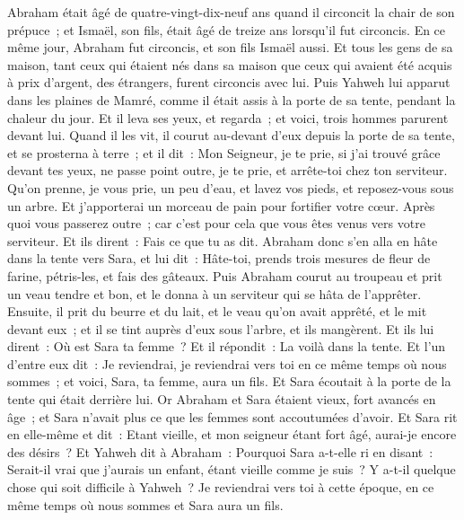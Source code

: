 \begin{multicols}{2}
Abraham était âgé de quatre-vingt-dix-neuf ans quand il circoncit la chair de son prépuce~;
et Ismaël, son fils, était âgé de treize ans lorsqu'il fut circoncis.
En ce même jour, Abraham fut circoncis, et son fils Ismaël aussi.
Et tous les gens de sa maison, tant ceux qui étaient nés dans sa maison que ceux qui avaient été acquis à prix d'argent, des étrangers, furent circoncis avec lui.
\VerseOne{}Puis Yahweh lui apparut dans les plaines de Mamré, comme il était assis à la porte de sa tente, pendant la chaleur du jour.
Et il leva ses yeux, et regarda~; et voici, trois hommes parurent devant lui. Quand il les vit, il courut au-devant d'eux depuis la porte de sa tente, et se prosterna à terre~;
et il dit~: Mon Seigneur, je te prie, si j'ai trouvé grâce devant tes yeux, ne passe point outre, je te prie, et arrête-toi chez ton serviteur.
Qu'on prenne, je vous prie, un peu d'eau, et lavez vos pieds, et reposez-vous sous un arbre.
Et j'apporterai un morceau de pain pour fortifier votre cœur. Après quoi vous passerez outre~; car c'est pour cela que vous êtes venus vers votre serviteur. Et ils dirent~: Fais ce que tu as dit.
Abraham donc s'en alla en hâte dans la tente vers Sara, et lui dit~: Hâte-toi, prends trois mesures de fleur de farine, pétris-les, et fais des gâteaux.
Puis Abraham courut au troupeau et prit un veau tendre et bon, et le donna à un serviteur qui se hâta de l'apprêter.
Ensuite, il prit du beurre et du lait, et le veau qu'on avait apprêté, et le mit devant eux~; et il se tint auprès d'eux sous l'arbre, et ils mangèrent.
Et ils lui dirent~: Où est Sara ta femme~? Et il répondit~: La voilà dans la tente.
Et l'un d'entre eux dit~: Je reviendrai, je reviendrai vers toi en ce même temps où nous sommes~; et voici, Sara, ta femme, aura un fils. Et Sara écoutait à la porte de la tente qui était derrière lui.
Or Abraham et Sara étaient vieux, fort avancés en âge~; et Sara n'avait plus ce que les femmes sont accoutumées d'avoir.
Et Sara rit en elle-même et dit~: Etant vieille, et mon seigneur étant fort âgé, aurai-je encore des désirs~?
Et Yahweh dit à Abraham~: Pourquoi Sara a-t-elle ri en disant~: Serait-il vrai que j'aurais un enfant, étant vieille comme je suis~?
Y a-t-il quelque chose qui soit difficile à Yahweh~? Je reviendrai vers toi à cette époque, en ce même temps où nous sommes et Sara aura un fils.

\end{multicols}

